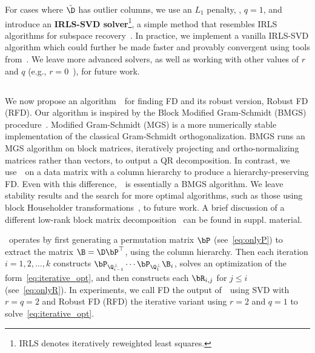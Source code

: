 For cases where $\tilde{\D}$ has outlier columns, we use an $L_1$ penalty, \ie, $q=1$, and introduce an \textbf{IRLS-SVD solver}\footnote{IRLS denotes iteratively reweighted least squares.}, a simple method that resembles IRLS algorithms for subspace recovery~\cite{zhang2014novel,lerman2015robust,vidal2018dpcp,lerman2018fast,lerman2018overview,garg2019subspace,mankovich2022flag}. In practice, we implement a vanilla IRLS-SVD algorithm which could further be made faster and provably convergent using tools from~\cite{aftab2014generalized,beck2015weiszfeld,kummerle2021iteratively,kummerle2021scalable,verdun2024fast}. We leave more advanced solvers, as well as working with other values of $r$ and $q$ (e.g., $r=0$~\cite{liu2012robust}), for future work.



\subsection{\algname}
We now propose an algorithm~\algname~for finding FD and its robust version, Robust FD (RFD). Our algorithm is inspired by the Block Modified Gram-Schmidt (BMGS) procedure~\cite{jalby1991stability,barlow2019block}. Modified Gram-Schmidt (MGS) is a more numerically stable implementation of the classical Gram-Schmidt orthogonalization. BMGS runs an MGS algorithm on block matrices, iteratively projecting and ortho-normalizing matrices rather than vectors, to output a QR decomposition. In contrast, we use~\algname~on a data matrix with a column hierarchy to produce a hierarchy-preserving FD. Even with this difference,~\algname~is essentially a BMGS algorithm. We leave stability results and the search for more optimal algorithms, such as those using block Householder transformations~\cite{griem2024block}, to future work. A brief discussion of a different low-rank block matrix decomposition~\cite{ong2016beyond} can be found in suppl. material.


\algname~operates by first generating a permutation matrix $\bP$ (see~\cref{eq:onlyP}) to extract the matrix $\B = \D\bP^\top$, using the column hierarchy. Then each iteration $i=1,2,\dots,k$ constructs $\bP_{\Q_{i-1}^\perp}\cdots \bP_{\Q_1^\perp} \B_i$, solves an optimization of the form~\cref{eq:iterative_opt}, and then constructs each $\bR_{i,j}$ for $j \leq i$ (see~\cref{eq:onlyR}). In experiments, we call FD the output of~\algname~using SVD with $r=q=2$ and Robust FD (RFD) the iterative variant using $r=2$ and $q=1$ to solve~\cref{eq:iterative_opt}. 



